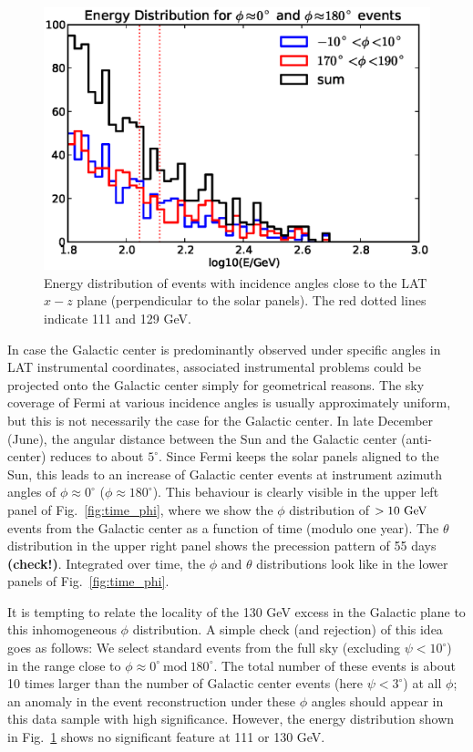 \documentclass[aps,twocolumn,prd,superscriptaddress,showpacs,nofootinbib,fixfloat]{revtex4}
\newcommand{\GeV}{{\rm ~GeV}}
\begin{document}
\begin{figure}
\centering
\includegraphics[width=1.0\linewidth]{plots/phi_energy.eps}
\caption{Energy distribution of events with incidence angles close to
the LAT $x-z$ plane (perpendicular to the solar panels). The red dotted lines
indicate 111 and 129 GeV.}
\label{fig:spectrum_phi}
\end{figure}

In case the Galactic center is predominantly observed under specific angles in
LAT instrumental coordinates, associated instrumental problems could be
projected onto the Galactic center simply for geometrical reasons. The sky
coverage of Fermi at various incidence angles is usually approximately uniform,
but this is not necessarily the case for the Galactic center.  In late December
(June), the angular distance between the Sun and the Galactic center
(anti-center) reduces to about $5^\circ$.  Since Fermi keeps the solar panels
aligned to the Sun, this leads to an increase of Galactic center events at
instrument azimuth angles of $\phi\approx 0^\circ$ ($\phi\approx 180^\circ$).
This behaviour is clearly visible in the upper left panel of Fig.~\ref{fig:time_phi}, where we show
the $\phi$ distribution of $>10\GeV$ events from the Galactic center as
a function of time (modulo one year).  The $\theta$ distribution in the upper
right panel shows the precession pattern of 55 days \textbf{(check!)}.
Integrated over time, the $\phi$ and $\theta$ distributions look like in the
lower panels of Fig.~\ref{fig:time_phi}.

It is tempting to relate the locality of the 130 GeV excess in the Galactic
plane to this inhomogeneous $\phi$ distribution. A simple check (and
rejection) of this idea goes as follows: We select standard events from the
full sky (excluding $\psi < 10^\circ$) in the range close to $\phi\approx
0^\circ\ \text{mod}\ 180^\circ$. The total number of these events is about 10
times larger than the number of Galactic center events (here $\psi<3^\circ$)
at all $\phi$; an anomaly in the event reconstruction under these $\phi$
angles should appear in this data sample with high significance. However, the
energy distribution shown in Fig.~\ref{fig:spectrum_phi} shows no significant
feature at 111 or 130 GeV.
\end{document}
